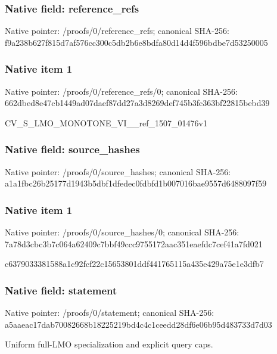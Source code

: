 \documentclass[10pt,a4paper]{article}
\begin{document}
\subsubsection{Native field: reference\_\allowbreak{}refs}
Native pointer: /proofs/0/reference\_\allowbreak{}refs; canonical SHA-256: f9a238b627f815d7af576cc300c5db2b6e8bdfa80d14d4f596bdbe7d53250005

\subsubsection{Native item 1}
Native pointer: /proofs/0/reference\_\allowbreak{}refs/0; canonical SHA-256: 662dbed8e47cb1449ad07daef87dd27a3d8269def745b3fc363bf22815bebd39

\begingroup\raggedright\sloppy CV\_\allowbreak{}S\_\allowbreak{}LMO\_\allowbreak{}MONOTONE\_\allowbreak{}VI\_\allowbreak{}\_\allowbreak{}ref\_\allowbreak{}1507\_\allowbreak{}01476v1\par\endgroup

\subsubsection{Native field: source\_\allowbreak{}hashes}
Native pointer: /proofs/0/source\_\allowbreak{}hashes; canonical SHA-256: a1a1fbc26b25177d1943b5dbf1dfedec0fdbfd1b007016bae9557d6488097f59

\subsubsection{Native item 1}
Native pointer: /proofs/0/source\_\allowbreak{}hashes/0; canonical SHA-256: 7a78d3cbc3b7c064a62409c7bbf49ccc9755172aac351eaefdc7cef41a7fd021

\begingroup\raggedright\sloppy c6379033381588a1c92fcf22c15653801ddf441765115a435e429a75e1e3dfb7\par\endgroup

\subsubsection{Native field: statement}
Native pointer: /proofs/0/statement; canonical SHA-256: a5aaeac17dab70082668b18225219bd4c4c1ceedd28df6e06b95d483733d7d03

\begingroup\raggedright\sloppy Uniform full-LMO specialization and explicit query caps.\par\endgroup
\end{document}
